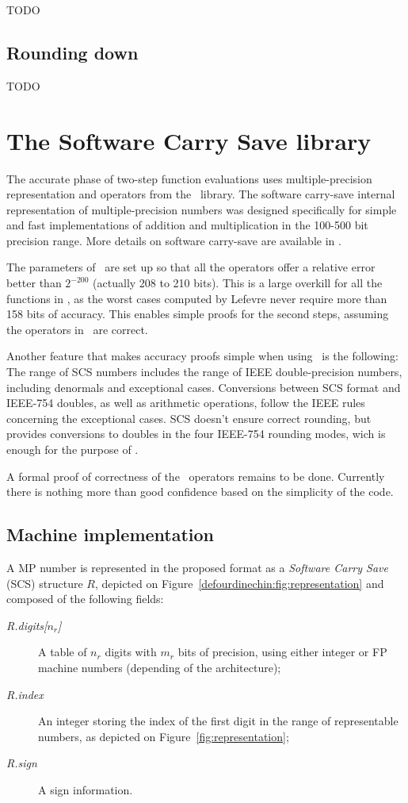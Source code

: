 TODO

\subsection{Rounding down}

TODO







\section{The Software Carry Save library}

The accurate phase of two-step function evaluations uses
multiple-precision representation and operators from the \scslib\ 
library.  The software carry-save internal representation of
multiple-precision numbers was designed specifically for simple and
fast implementations of addition and multiplication in the 100-500 bit
precision range. More details on software carry-save are available in
\cite{DefDin2002,DinDef2003}.

The parameters of \scslib\ are set up so that all the operators offer
a relative error better than $2^{-200}$ (actually 208 to 210 bits).
This is a large overkill for all the functions in \crlibm, as the
worst cases computed by Lefevre never require more than 158 bits of
accuracy. This enables simple proofs for the second steps, assuming
the operators in \scslib\ are correct.

Another feature that makes accuracy proofs simple when using \scslib\ 
is the following: The range of SCS numbers includes the range of IEEE
double-precision numbers, including denormals and exceptional cases.
Conversions between SCS format and IEEE-754 doubles, as well as
arithmetic operations, follow the IEEE rules concerning the
exceptional cases. SCS doesn't ensure correct rounding, but provides
conversions to doubles in the four IEEE-754 rounding modes, wich is
enough for the purpose of \crlibm.

A formal proof of correctness of the \scslib\ operators remains to be
done. Currently there is nothing more than good confidence based on
the simplicity of the code.


\subsection{Machine implementation}
 A MP number is represented in the proposed format as a
\emph{Software Carry Save} (SCS) structure $R$, depicted on
Figure~\ref{defourdinechin:fig:representation} and composed of the following
fields:
\begin{description}
\item[\emph{R.digits[$n_r$]}] A table of $n_r$ digits with $m_r$ bits
  of precision, using either integer or FP machine numbers 
  (depending of the architecture);
\item[\emph{R.index}] An integer storing the index of the first digit
  in the range of representable numbers, as depicted on
  Figure~\ref{fig:representation};
 \item[\emph{R.sign}] A sign information.  
\end{description}

